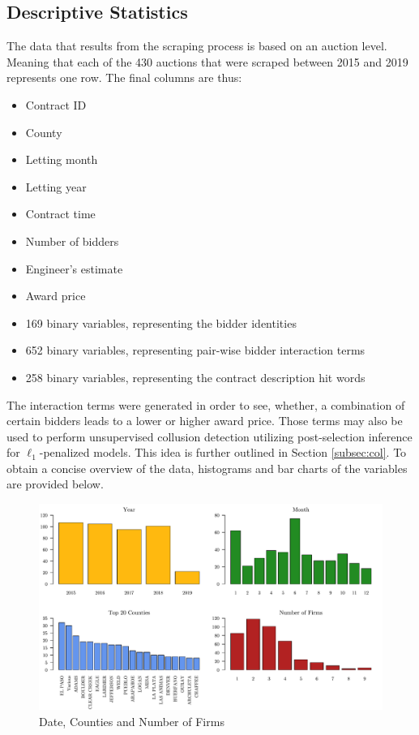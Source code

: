 \documentclass[a4paper,12pt, headsepline]{scrartcl}
\numberwithin{equation}{section}
\begin{document}
\subsection{Descriptive Statistics}\label{subsec:desc}
The data that results from the scraping process is based on an auction level. Meaning that each of the 430 auctions that were scraped between 2015 and 2019 represents one row. The final columns are thus:

\begin{itemize}
	\item Contract ID
	\item County
	\item Letting month
	\item Letting year
	\item Contract time
	\item Number of bidders
	\item Engineer's estimate
	\item Award price
	\item 169 binary variables, representing the bidder identities
	\item 652 binary variables, representing pair-wise bidder interaction terms 
	\item 258 binary variables, representing the contract description hit words
\end{itemize}

The interaction terms were generated in order to see, whether, a combination of certain bidders leads to a lower or higher award price. Those terms may also be used to perform unsupervised collusion detection utilizing post-selection inference for $\ell_1$-penalized models. This idea is further outlined in Section \ref{subsec:col}. To obtain a concise overview of the data,  histograms and bar charts of the variables are provided below.

\begin{figure}[H]
	\includegraphics[width = 14	cm]{figures/barplots.pdf}
	\caption{Date, Counties and Number of Firms}\label{fig:barplots}
\end{figure}
\end{document}

